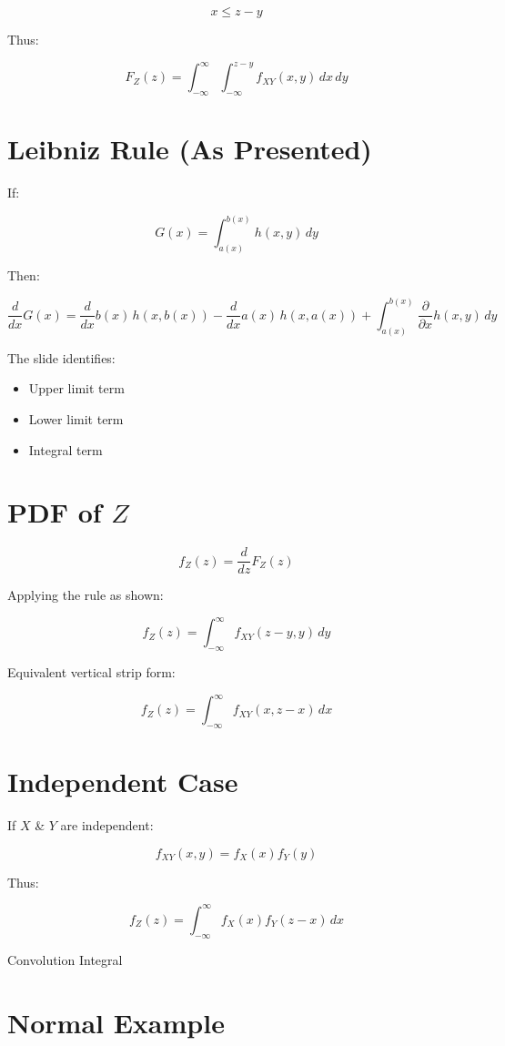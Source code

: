 \documentclass[12pt]{article}
\begin{document}
\[
x \le z-y
\]

Thus:

\[
F_Z(z)
=
\int_{-\infty}^{\infty}
\int_{-\infty}^{z-y}
f_{XY}(x,y)\,dx\,dy
\]

\section{Leibniz Rule (As Presented)}

If:

\[
G(x)=\int_{a(x)}^{b(x)} h(x,y)\,dy
\]

Then:

\[
\frac{d}{dx}G(x)
=
\frac{d}{dx}b(x)\,h(x,b(x))
-
\frac{d}{dx}a(x)\,h(x,a(x))
+
\int_{a(x)}^{b(x)}
\frac{\partial}{\partial x}h(x,y)\,dy
\]

The slide identifies:

\begin{itemize}
    \item Upper limit term
    \item Lower limit term
    \item Integral term
\end{itemize}

\section{PDF of \( Z \)}

\[
f_Z(z)=\frac{d}{dz}F_Z(z)
\]

Applying the rule as shown:

\[
f_Z(z)
=
\int_{-\infty}^{\infty}
f_{XY}(z-y,y)\,dy
\]

Equivalent vertical strip form:

\[
\boxed{
f_Z(z)
=
\int_{-\infty}^{\infty}
f_{XY}(x,z-x)\,dx
}
\]

\section{Independent Case}

If \( X \) \& \( Y \) are independent:

\[
f_{XY}(x,y)=f_X(x)f_Y(y)
\]

Thus:

\[
\boxed{
f_Z(z)
=
\int_{-\infty}^{\infty}
f_X(x)f_Y(z-x)\,dx
}
\]

Convolution Integral

\section{Normal Example}
\end{document}
